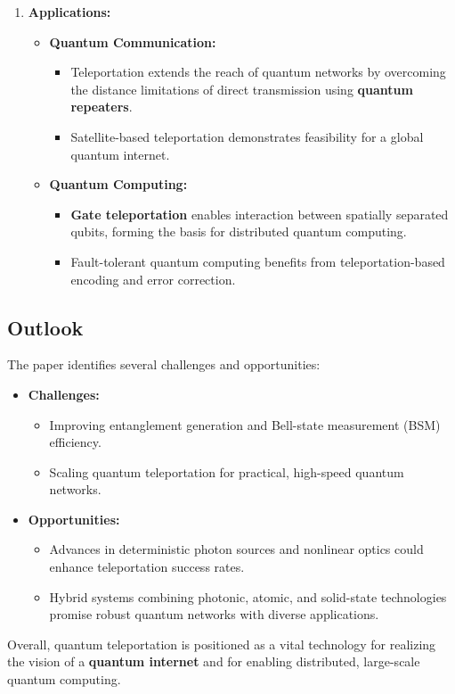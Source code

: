 \documentclass[paper=a4, fontsize=11pt]{scrartcl} %
\numberwithin{figure}{section} %
\numberwithin{table}{section} %
\begin{document}
\begin{enumerate}
    \item \textbf{Applications:}
    \begin{itemize}
        \item \textbf{Quantum Communication:}
        \begin{itemize}
            \item Teleportation extends the reach of quantum networks by overcoming the distance limitations of direct transmission using \textbf{quantum repeaters}.
            \item Satellite-based teleportation demonstrates feasibility for a global quantum internet.
        \end{itemize}
        \item \textbf{Quantum Computing:}
        \begin{itemize}
            \item \textbf{Gate teleportation} enables interaction between spatially separated qubits, forming the basis for distributed quantum computing.
            \item Fault-tolerant quantum computing benefits from teleportation-based encoding and error correction.
        \end{itemize}
    \end{itemize}
\end{enumerate}

\subsection*{Outlook}
The paper identifies several challenges and opportunities:
\begin{itemize}
    \item \textbf{Challenges:}
    \begin{itemize}
        \item Improving entanglement generation and Bell-state measurement (BSM) efficiency.
        \item Scaling quantum teleportation for practical, high-speed quantum networks.
    \end{itemize}
    \item \textbf{Opportunities:}
    \begin{itemize}
        \item Advances in deterministic photon sources and nonlinear optics could enhance teleportation success rates.
        \item Hybrid systems combining photonic, atomic, and solid-state technologies promise robust quantum networks with diverse applications.
    \end{itemize}
\end{itemize}

Overall, quantum teleportation is positioned as a vital technology for realizing the vision of a \textbf{quantum internet} and for enabling distributed, large-scale quantum computing.
\end{document}

